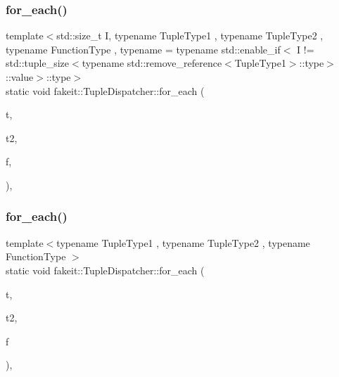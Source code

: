 \mbox{\label{structfakeit_1_1TupleDispatcher_a42566b7faaac776dc99492e7c0b973b3}} 
\subsubsection{\texorpdfstring{for\_each()}{for\_each()}\hspace{0.1cm}{\footnotesize\ttfamily [40/54]}}
{\footnotesize\ttfamily template$<$std\+::size\+\_\+t I, typename Tuple\+Type1 , typename Tuple\+Type2 , typename Function\+Type , typename  = typename std\+::enable\+\_\+if$<$            I != std\+::tuple\+\_\+size$<$typename std\+::remove\+\_\+reference$<$\+Tuple\+Type1$>$\+::type$>$\+::value$>$\+::type$>$ \\
static void fakeit\+::\+Tuple\+Dispatcher\+::for\+\_\+each (\begin{DoxyParamCaption}\item[{Tuple\+Type1 \&\&}]{t,  }\item[{Tuple\+Type2 \&\&}]{t2,  }\item[{Function\+Type \&}]{f,  }\item[{std\+::integral\+\_\+constant$<$ size\+\_\+t, I $>$}]{ }\end{DoxyParamCaption})\hspace{0.3cm}{\ttfamily [inline]}, {\ttfamily [static]}}

\mbox{\label{structfakeit_1_1TupleDispatcher_a1ddb90f24aa73dd61bf2b95c5f176cd5}} 
\subsubsection{\texorpdfstring{for\_each()}{for\_each()}\hspace{0.1cm}{\footnotesize\ttfamily [41/54]}}
{\footnotesize\ttfamily template$<$typename Tuple\+Type1 , typename Tuple\+Type2 , typename Function\+Type $>$ \\
static void fakeit\+::\+Tuple\+Dispatcher\+::for\+\_\+each (\begin{DoxyParamCaption}\item[{Tuple\+Type1 \&\&}]{t,  }\item[{Tuple\+Type2 \&\&}]{t2,  }\item[{Function\+Type \&}]{f }\end{DoxyParamCaption})\hspace{0.3cm}{\ttfamily [inline]}, {\ttfamily [static]}}

